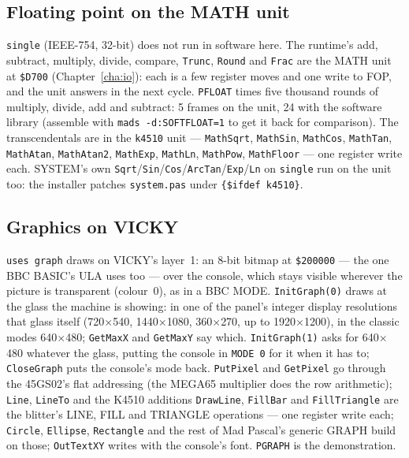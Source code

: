 \subsection*{Floating point on the MATH unit}
\texttt{single} (IEEE-754, 32-bit) does not run in software here. The
runtime's add, subtract, multiply, divide, compare, \verb|Trunc|,
\verb|Round| and \verb|Frac| are the MATH unit at \texttt{\$D700}
(Chapter~\ref{cha:io}): each is a few register moves and one write to
FOP, and the unit answers in the next cycle. \texttt{PFLOAT} times five
thousand rounds of multiply, divide, add and subtract: 5 frames on the
unit, 24 with the software library (assemble with
\verb|mads -d:SOFTFLOAT=1| to get it back for comparison). The
transcendentals are in the \texttt{k4510} unit --- \verb|MathSqrt|,
\verb|MathSin|, \verb|MathCos|, \verb|MathTan|, \verb|MathAtan|,
\verb|MathAtan2|, \verb|MathExp|, \verb|MathLn|, \verb|MathPow|,
\verb|MathFloor| --- one register write each. SYSTEM's own
\verb|Sqrt|/\verb|Sin|/\verb|Cos|/\verb|ArcTan|/\verb|Exp|/\verb|Ln| on
\texttt{single} run on the unit too: the installer patches
\texttt{system.pas} under \verb|{$ifdef k4510}|.

\subsection*{Graphics on VICKY}
\verb|uses graph| draws on VICKY's layer~1: an 8-bit bitmap at
\texttt{\$200000} --- the one BBC BASIC's ULA uses too --- over the
console, which stays visible wherever the picture is transparent
(colour~0), as in a BBC MODE. \verb|InitGraph(0)| draws at the glass the
machine is showing: in one of the panel's integer display resolutions
that glass itself (720$\times$540, 1440$\times$1080, 360$\times$270, up to
1920$\times$1200), in the classic modes 640$\times$480; \verb|GetMaxX| and
\verb|GetMaxY| say which. \verb|InitGraph(1)| asks for 640$\times$480
whatever the glass, putting the console in \verb|MODE 0| for it when it
has to; \verb|CloseGraph| puts the console's mode back. \verb|PutPixel| and \verb|GetPixel| go through the 45GS02's
flat addressing (the MEGA65 multiplier does the row arithmetic);
\verb|Line|, \verb|LineTo| and the K4510 additions \verb|DrawLine|,
\verb|FillBar| and \verb|FillTriangle| are the blitter's LINE, FILL and
TRIANGLE operations --- one register write each; \verb|Circle|,
\verb|Ellipse|, \verb|Rectangle| and the rest of Mad Pascal's generic
GRAPH build on those; \verb|OutTextXY| writes with the console's font.
\verb|PGRAPH| is the demonstration.

